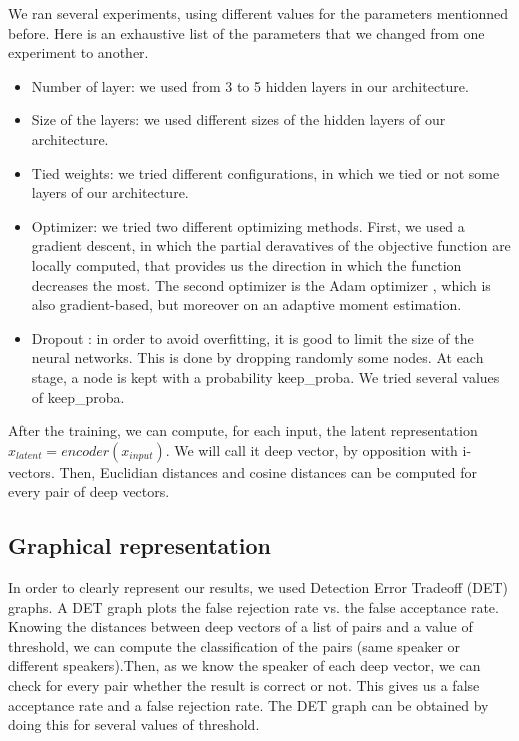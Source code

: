 \documentclass[conference]{IEEEtran}
\begin{document}
We ran several experiments, using different values for the parameters mentionned before.
Here is an exhaustive list of the parameters that we changed from one experiment to another.

\begin{itemize}
\item{Number of layer}: we used from 3 to 5 hidden layers in our architecture.
\item{Size of the layers}: we used different sizes of the hidden layers of our architecture.
\item{Tied weights}: we tried different configurations, in which we tied or not some layers of our architecture.
\item{Optimizer}: we tried two different optimizing methods. First, we used a gradient descent, in which the partial deravatives of the objective function are locally computed, that provides us the direction in which the function decreases the most. The second optimizer is the Adam optimizer \cite{DBLP:journals/corr/KingmaB14}, which is also gradient-based, but moreover on an adaptive moment estimation.
\item{Dropout} \cite{Srivastava:2014:DSW:2627435.2670313}: in order to avoid overfitting, it is good to limit the size of the neural networks. This is done by dropping randomly some nodes. At each stage, a node is kept with a probability keep\_proba. We tried several values of keep\_proba.
\end{itemize}

After the training, we can compute, for each input, the latent representation $x_{latent} = encoder(x_{input})$. We will call it deep vector, by opposition with i-vectors. Then, Euclidian distances and cosine distances can be computed for every pair of deep vectors.

\subsection{Graphical representation}

In order to clearly represent our results, we used Detection Error Tradeoff (DET) graphs. A DET graph plots the false rejection rate vs. the false acceptance rate. Knowing the distances between deep vectors of a list of pairs and a value of threshold, we can compute the classification of the pairs (same speaker or different speakers).Then, as we know the speaker of each deep vector, we can check for every pair whether the result is correct or not. This gives us a false acceptance rate and a false rejection rate. The DET graph can be obtained by doing this for several values of threshold.
\end{document}
